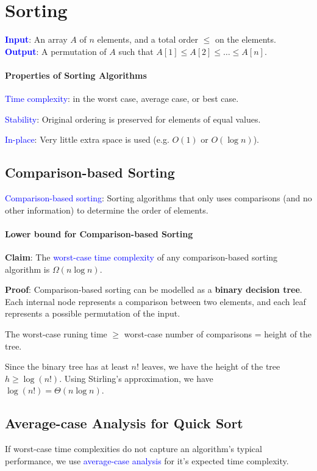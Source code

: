 \section{Sorting}
\textbf{\textcolor{Blue}{Input}}: An array $A$ of $n$ elements, and a total order $\le$ on the elements.\\
\textbf{\textcolor{Blue}{Output}}: A permutation of $A$ such that $A[1]\le A[2]\le \ldots \le A[n]$.

\paragraph{Properties of Sorting Algorithms}
\textcolor{Blue}{Time complexity}: in the worst case, average case, or best
case.

\textcolor{Blue}{Stability}: Original ordering is preserved for elements of
equal values.

\textcolor{Blue}{In-place}: Very little extra space is used (e.g. $O(1)$ or
$O(\log n)$).

\subsection{Comparison-based Sorting}
\textcolor{Blue}{Comparison-based sorting}: Sorting algorithms that
only uses comparisons (and no other information) to determine the order of
elements.

\paragraph{Lower bound for Comparison-based Sorting}
\textbf{Claim}: The \textcolor{Blue}{worst-case time complexity} of any
comparison-based sorting algorithm is $\Omega(n\log n)$.

\textbf{Proof}:
Comparison-based sorting can be modelled as a
\textbf{\textcolor{Bittersweet}{binary decision tree}}. Each internal node
represents a \textcolor{Bittersweet}{comparison} between two elements, and each
leaf represents a possible permutation of the input.

The worst-case runing time $\ge $ worst-case number of comparisons = height of
the tree.

Since the \textcolor{Bittersweet}{binary tree has at least $n\mathpunct{!}$
leaves}, we have the height of the tree $h\ge \log{\left( n\mathpunct{!}
\right) }$. Using Stirling's approximation, we have $\log{\left( n\mathpunct{!}
\right) } = \Theta(n\log n)$.

\subsection{Average-case Analysis for Quick Sort}
If worst-case time complexities do not capture an algorithm's typical
performance, we use \textcolor{Blue}{average-case analysis} for it's expected
time complexity.

